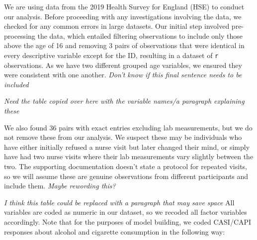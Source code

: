 \documentclass[
  11pt,
]{article}
\begin{document}
We are using data from the 2019 Health Survey for England (HSE) to
conduct our analysis. Before proceeding with any investigations
involving the data, we checked for any common errors in large datasets.
Our initial step involved pre-processing the data, which entailed
filtering observations to include only those above the age of 16 and
removing 3 pairs of observations that were identical in every
descriptive variable except for the ID, resulting in a dataset of
\texttt{r} observations. As we have two different grouped age variables,
we ensured they were consistent with one another. \emph{Don't know if
this final sentence needs to be included}

\emph{Need the table copied over here with the variable names/a
paragraph explaining these}

We also found 36 pairs with exact entries excluding lab measurements,
but we do not remove these from our analysis. We suspect these may be
individuals who have either initially refused a nurse visit but later
changed their mind, or simply have had two nurse visits where their lab
measurements vary slightly between the two. The supporting documentation
doesn't state a protocol for repeated visits, so we will assume these
are genuine observations from different participants and include them.
\emph{Maybe rewording this?}

\emph{I think this table could be replaced with a paragraph that may
save space} All variables are coded as numeric in our dataset, so we
recoded all factor variables accordingly. Note that for the purposes of
model building, we coded CASI/CAPI responses about alcohol and cigarette
consumption in the following way:
\end{document}
